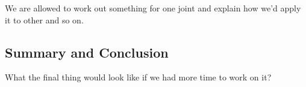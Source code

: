 \documentclass[paper=a4, fontsize=11pt]{scrartcl} %
\numberwithin{equation}{section} %
\numberwithin{figure}{section} %
\numberwithin{table}{section} %
\begin{document}
We are allowed to work out something for one joint and explain how we'd apply it to other and so on.

\subsection{Summary and Conclusion}
What the final thing would look like if we had more time to work on it?

\end{document}

